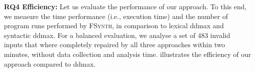 \documentclass[sigconf,review,anonymous]{acmart}
\newcounter{todocounter}
\newcommand{\todo}[1]{\marginpar{$|$}\textcolor{red}{\stepcounter{todocounter}\footnote[\thetodocounter]{\textcolor{red}{\textbf{TODO }}\textit{#1}}}}
\newcommand{\recheck}[1]{\textcolor{red}{#1}}
\renewcommand{\todo}[1]{}
\newcommand{\approach}{\textsc{FSynth}\xspace}
\begin{document}
\noindent
\textbf{RQ4 Efficiency:}
Let us evaluate the performance of our approach.
To this end, we measure the time performance (i.e., execution time) and the number of program runs performed
by \approach, in comparison to lexical ddmax and syntactic ddmax. For a balanced evaluation, we
analyse a set of 483 invalid inputs %
that where completely repaired by all three approaches within %
two minutes, %
without %
data collection and %
analysis time.
illustrates the efficiency of our approach compared to ddmax. %

\end{document}
